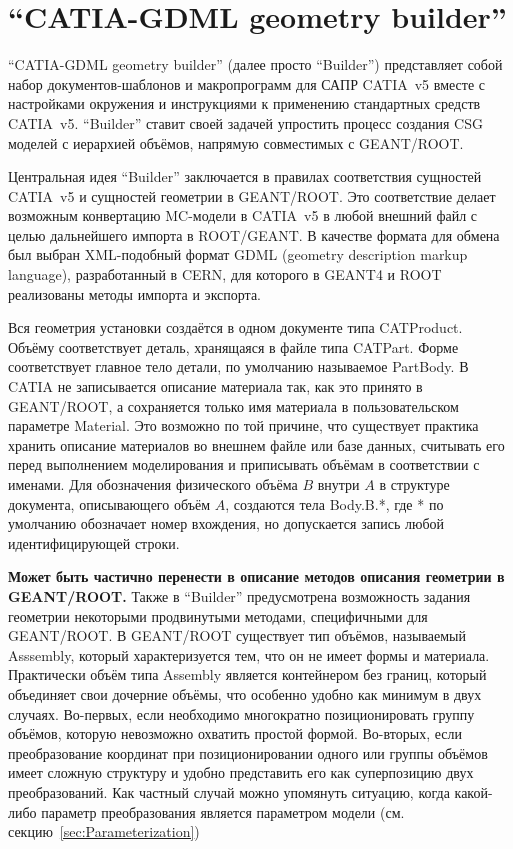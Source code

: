 \section{``CATIA-GDML geometry builder''}\label{sec:secBuilder}

``CATIA-GDML geometry builder'' (далее просто ``Builder'') представляет собой набор документов-шаблонов и макропрограмм для САПР CATIA~v5 вместе с настройками окружения и инструкциями к применению стандартных средств CATIA~v5. ``Builder'' ставит своей задачей упростить процесс создания CSG моделей с иерархией объёмов, напрямую совместимых с GEANT/ROOT.

Центральная идея ``Builder'' заключается в правилах соответствия сущностей CATIA~v5 и сущностей геометрии в GEANT/ROOT. Это соответствие делает возможным конвертацию MC-модели в CATIA~v5 в любой внешний файл с целью дальнейшего импорта в ROOT/GEANT. В качестве формата для обмена был выбран XML-подобный формат GDML (geometry description markup language), разработанный в CERN, для которого в GEANT4 и ROOT реализованы методы импорта и экспорта.

Вся геометрия установки создаётся в одном документе типа CATProduct. Объёму соответствует деталь, хранящаяся в файле типа CATPart. Форме соответствует главное тело детали, по умолчанию называемое PartBody. В CATIA не записывается описание материала так, как это принято в GEANT/ROOT, а сохраняется только имя материала в пользовательском параметре Material. Это возможно по той причине, что существует практика хранить описание материалов во внешнем файле или базе данных, считывать его перед выполнением моделирования и приписывать объёмам в соответствии с именами. Для обозначения физического объёма $B$ внутри $A$ в структуре документа, описывающего объём $A$, создаются тела Body.B.*, где * по умолчанию обозначает номер вхождения, но допускается запись любой идентифицирующей строки.

\textbf{Может быть частично перенести в описание методов описания геометрии в GEANT/ROOT.}
Также в ``Builder'' предусмотрена возможность задания геометрии некоторыми продвинутыми методами, специфичными для GEANT/ROOT. В GEANT/ROOT существует тип объёмов, называемый Asssembly, который характеризуется тем, что он не имеет формы и материала. Практически объём типа Assembly является контейнером без границ, который объединяет свои дочерние объёмы, что особенно удобно как минимум в двух случаях. Во-первых, если необходимо многократно позиционировать группу объёмов, которую невозможно охватить простой формой. Во-вторых, если преобразование координат при позиционировании одного или группы объёмов имеет сложную структуру и удобно представить его как суперпозицию двух преобразований. Как частный случай можно упомянуть ситуацию, когда какой-либо параметр преобразования является параметром модели (см. секцию~\ref{sec:Parameterization})

